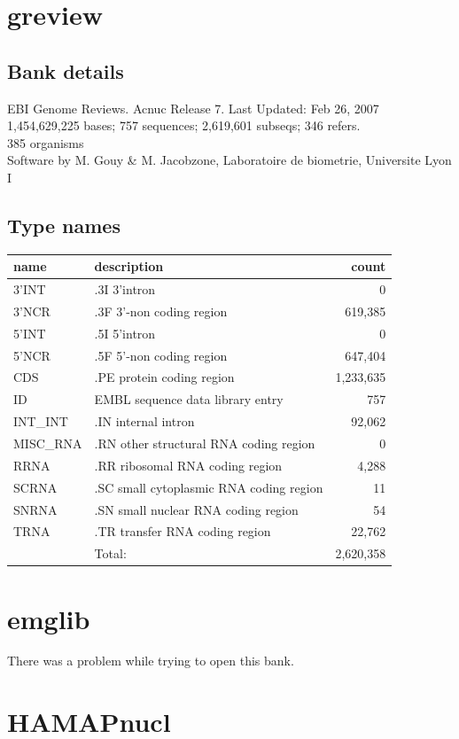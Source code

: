\documentclass{article}
\begin{document}
\begin{Schunk}
\section{ greview }
\subsection{Bank details}
EBI Genome Reviews. Acnuc Release 7. Last Updated: Feb 26, 2007\\
1,454,629,225 bases; 757 sequences; 2,619,601 subseqs; 346 refers.\\
385 organisms\\
Software by M. Gouy \& M. Jacobzone, Laboratoire de biometrie, Universite Lyon I

\subsection{Type names}
\noindent\begin{tabular}{llr}
\hline \hline
name & description & count \\
\hline
3'INT  &  .3I 3'intron  &  0 \\
3'NCR  &  .3F  3'-non coding region  &  619,385 \\
5'INT  &  .5I 5'intron  &  0 \\
5'NCR  &  .5F  5'-non coding region  &  647,404 \\
CDS  &  .PE protein coding region  &  1,233,635 \\
ID  &  EMBL sequence data library entry  &  757 \\
INT\_INT  &  .IN  internal intron  &  92,062 \\
MISC\_RNA  &  .RN other structural RNA coding region  &  0 \\
RRNA  &  .RR ribosomal RNA coding region  &  4,288 \\
SCRNA  &  .SC small cytoplasmic RNA coding region  &  11 \\
SNRNA  &  .SN small nuclear RNA coding region  &  54 \\
TRNA  &  .TR transfer RNA coding region  &  22,762 \\
\hline
 & Total: & 2,620,358 \\
\hline \hline
\end{tabular}

\section{ emglib }
There was a problem while trying to open this bank.
\section{ HAMAPnucl }

\end{Schunk}
\end{document}
